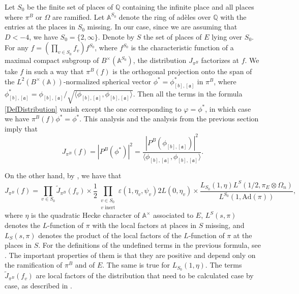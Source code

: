 \documentclass[11pt]{amsart}
\newcommand{\Q}{\mathbb{Q}}
\newcommand{\A}{\mathbb{A}}
\renewcommand{\a}{\mathfrak{a}}
\theoremstyle{definition}
\theoremstyle{remark}
\begin{document}
Let $S_0$ be the finite set of places of $\Q$ containing the infinite place and all places where $\pi^B$ or $\Omega$ are ramified. Let $\A^{S_0}$ denote the ring of adèles over $\Q$ with the entries at the places in $S_0$ missing. In our case, since we are assuming that $D<-4$, we have $S_0=\{2,\infty\}$. 
Denote by $S$ the set of places of $E$ lying over $S_0$. For any $f=\left(\prod_{v\in S_0} f_v\right)f^{S_0}$, where $f^{S_0}$ is the characteristic function of a maximal compact subgroup of $B^{\times}(\A^{S_0})$, the distribution $J_{\pi^{B}}$ factorizes at $f$. We take $f$ in such a way that $\pi^{B}(f)$ is the orthogonal projection onto the span of the $L^2(B^{\times}(\A))$-normalized spherical vector $\phi^{*} = \phi_{[b], [\a]}^{*}$ in $\pi^{B}$, where $\phi_{[b], [\a]}^{*} = \phi_{[b], [\a]} / \sqrt{\langle \phi_{[b], [\a]}, \phi_{[b], [\a]} \rangle}$.
Then all the terms in the formula \eqref{DefDistribution} vanish except the one corresponding to $\varphi = \phi^{*}$, in which case we have $\pi^{B}(f) \phi^{*} = \phi^{*}$. This analysis and the analysis from the previous section imply that
\begin{equation}
    J_{\pi^{B}}(f) = |P^{B}(\phi^{*})|^2 = \frac{|P^{B}(\phi_{[b], [\a]})|^2}{\langle \phi_{[b], [\a]}, \phi_{[b], [\a]} \rangle}. \label{Dist+PeriodInt}
\end{equation}

On the other hand, by \cite[\S 6, Thm. 2]{JacChen}, we have that
\begin{equation}
    J_{\pi^{B}}(f) = \prod_{v\in S_0} \tilde{J}_{\pi^B}(f_v) \times \frac{1}{2}\prod_{\substack{v\in S_0 \\ v \text{ inert}}} \varepsilon(1,\eta_{v},\psi_{v}) 2L(0,\eta_{v}) \times \frac{L_{S_0}(1,\eta) L^{S}(1/2, \pi_E \otimes \Omega_n)}{L^{S_0}(1,\mathrm{Ad}(\pi))}, \label{FactJacChen}
\end{equation}
where $\eta$ is the quadratic Hecke character of $\A^{\times}$ associated to $E$, $L^{S}(s,\pi)$ denotes the $L$-function of $\pi$ with the local factors at places in $S$ missing, and $L_{S}(s,\pi)$ denotes the product of the local factors of the $L$-function of $\pi$ at the places in $S$. For the definitions of the undefined terms in the previous formula, see \cite{JacChen}. The important properties of them is that they are positive and depend only on the ramification of $\pi^B$ and of $E$. The same is true for $L_{S_0}(1,\eta)$. The terms $\tilde{J}_{\pi^{B}}(f_{v})$ are local factors of the distribution that need to be calculated case by case, as described in \cite{JacChen}. 
\end{document}

